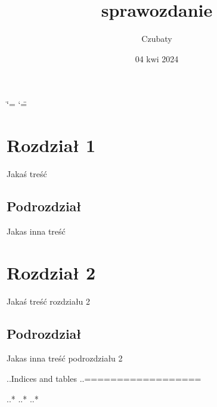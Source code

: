 \documentclass[letterpaper,10pt,polish]{sphinxmanual}
\title{sprawozdanie}
\date{04 kwi 2024}
\author{Czubaty}
\begin{document}
\ifdefined\shorthandoff
  \ifnum\catcode`\=\string=\active\shorthandoff{=}\fi
  \ifnum\catcode`\"=\active{}\fi
\fi

\pagestyle{empty}
\sphinxmaketitle
\pagestyle{plain}
\sphinxtableofcontents
\pagestyle{normal}
\label{\detokenize{index::doc}}


\sphinxstepscope


\chapter{Rozdział 1}
\label{\detokenize{rozdzialy/rozdzial1:rozdzial-1}}\label{\detokenize{rozdzialy/rozdzial1::doc}}
\sphinxAtStartPar
Jakaś treść


\section{Podrozdział}
\label{\detokenize{rozdzialy/rozdzial1:podrozdzial}}
\sphinxAtStartPar
Jakas inna treść

\sphinxstepscope


\chapter{Rozdział 2}
\label{\detokenize{rozdzialy/rozdzial2:rozdzial-2}}\label{\detokenize{rozdzialy/rozdzial2::doc}}
\sphinxAtStartPar
Jakaś treść rozdziału 2


\section{Podrozdział}
\label{\detokenize{rozdzialy/rozdzial2:podrozdzial}}
\sphinxAtStartPar
Jakas inna treść podrozdziału 2

\sphinxAtStartPar
..Indices and tables
..==================

\sphinxAtStartPar
..* 
..* 
..* 



\renewcommand{\indexname}{Indeks}
\printindex
\end{document}
